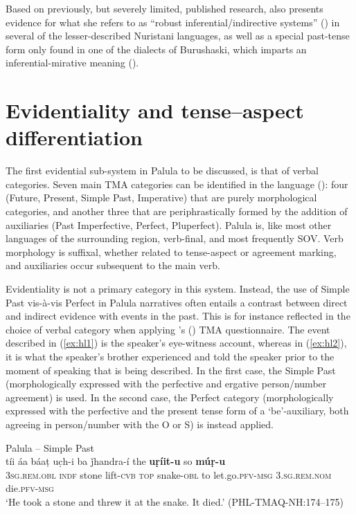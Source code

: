 \documentclass[output=paper]{langsci/langscibook}
\begin{document}
Based on previously, but severely limited, published research, \citeauthor{Bashir2006} also presents evidence for what she refers to as “robust inferential/indirective systems” (\citeyear{Bashir2006}) in several of the lesser-described Nuristani languages, as well as a special past-tense form only found in one of the dialects of Burushaski, which imparts an inferential-mirative meaning (\citeyear[14]{Bashir2010}). 


\section{Evidentiality and tense--aspect differentiation}\label{s:hl3}

The first evidential sub-system in Palula to be discussed, is that of verbal categories. Seven main TMA categories can be identified in the language (\citealt[247--263]{Liljegren2016}): four (Future, Present, Simple Past, Imperative) that are purely morphological categories, and another three that are periphrastically formed by the addition of auxiliaries (Past Imperfective, Perfect, Pluperfect). Palula is, like most other languages of the surrounding region, verb-final, and most frequently SOV. Verb morphology is suffixal, whether related to tense-aspect or agreement marking, and auxiliaries occur subsequent to the main verb.

Evidentiality is not a primary category in this system. Instead, the use of Simple Past vis-à-vis Perfect in Palula narratives often entails a contrast between direct and indirect evidence with events in the past. This is for instance reflected in the choice of verbal category when applying \citeauthor{Dahl1985}’s (\citeyear{Dahl1985}) TMA questionnaire. The event described in (‎\ref{ex:hl1}) is the speaker’s eye-witness account, whereas in ‎(\ref{ex:hl2}), it is what the speaker’s brother experienced and told the speaker prior to the moment of speaking that is being described. In the first case, the Simple Past (morphologically expressed with the perfective and ergative person/number agreement) is used. In the second case, the Perfect category (morphologically expressed with the perfective and the present tense form of a ‘be’-auxiliary, both agreeing in person/number with the O or S) is instead applied.

\begin{exe}
	\ex Palula -- Simple Past \label{ex:hl1}\\
	\gll tíi áa báaṭ uc̣h-i ba ǰhandra-í the \textbf{uṛíit-u} so \textbf{múṛ-u}\\
	{3\textsc{sg}.\textsc{rem}.\textsc{obl}} {\textsc{indf}} stone lift-\textsc{cvb} \textsc{top} snake-\textsc{obl} to {let.go.\textsc{pfv}-\textsc{msg}} {3.\textsc{sg}.\textsc{rem}.\textsc{nom}} {die.\textsc{pfv}-\textsc{msg}}\\
	‘He took a stone and threw it at the snake. It died.’ (PHL-TMAQ-NH:174–175)
\end{exe}
\end{document}

